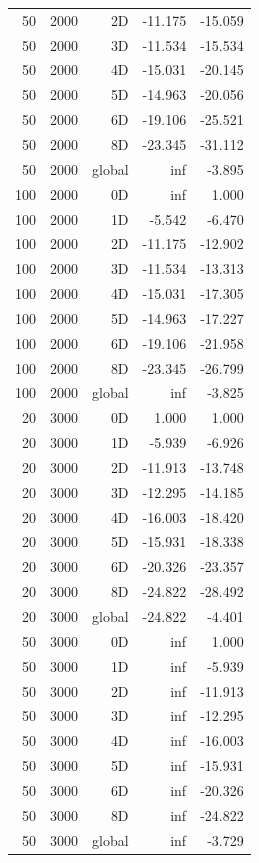 \begin{longtable}{rrrrr}
50 & 2000 & 2D & -11.175 & -15.059 \\
50 & 2000 & 3D & -11.534 & -15.534 \\
50 & 2000 & 4D & -15.031 & -20.145 \\
50 & 2000 & 5D & -14.963 & -20.056 \\
50 & 2000 & 6D & -19.106 & -25.521 \\
50 & 2000 & 8D & -23.345 & -31.112 \\
50 & 2000 & global & inf & -3.895 \\
100 & 2000 & 0D & inf & 1.000 \\
100 & 2000 & 1D & -5.542 & -6.470 \\
100 & 2000 & 2D & -11.175 & -12.902 \\
100 & 2000 & 3D & -11.534 & -13.313 \\
100 & 2000 & 4D & -15.031 & -17.305 \\
100 & 2000 & 5D & -14.963 & -17.227 \\
100 & 2000 & 6D & -19.106 & -21.958 \\
100 & 2000 & 8D & -23.345 & -26.799 \\
100 & 2000 & global & inf & -3.825 \\
20 & 3000 & 0D & 1.000 & 1.000 \\
20 & 3000 & 1D & -5.939 & -6.926 \\
20 & 3000 & 2D & -11.913 & -13.748 \\
20 & 3000 & 3D & -12.295 & -14.185 \\
20 & 3000 & 4D & -16.003 & -18.420 \\
20 & 3000 & 5D & -15.931 & -18.338 \\
20 & 3000 & 6D & -20.326 & -23.357 \\
20 & 3000 & 8D & -24.822 & -28.492 \\
20 & 3000 & global & -24.822 & -4.401 \\
50 & 3000 & 0D & inf & 1.000 \\
50 & 3000 & 1D & inf & -5.939 \\
50 & 3000 & 2D & inf & -11.913 \\
50 & 3000 & 3D & inf & -12.295 \\
50 & 3000 & 4D & inf & -16.003 \\
50 & 3000 & 5D & inf & -15.931 \\
50 & 3000 & 6D & inf & -20.326 \\
50 & 3000 & 8D & inf & -24.822 \\
50 & 3000 & global & inf & -3.729 \\

\end{longtable}
